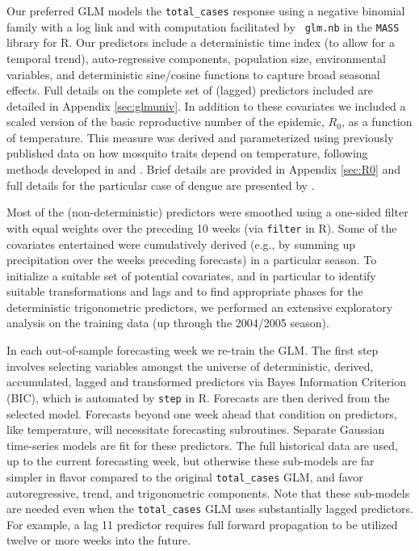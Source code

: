 \documentclass[12pt]{article}
\begin{document}
Our preferred GLM models the \verb!total_cases! response using a negative
binomial family with a log link and with computation facilitated by {\tt
glm.nb} in the {\tt MASS} library \citep{venables:ripley:2002} for {\sf R}.
Our predictors include a deterministic time index (to allow for a temporal
trend), auto-regressive components, population size, environmental variables,
and deterministic sine/cosine functions to capture broad seasonal effects.  
Full details on the complete set of (lagged) predictors included are detailed in Appendix
\ref{sec:glmuniv}. In
addition to these covariates we included a scaled version of the basic
reproductive number of the epidemic, $R_0$, as a function of temperature. This
measure was derived and parameterized using previously published data on how
mosquito traits depend on temperature, following methods developed in
\cite{mordecai:etal:2013} and \cite{johnson:etal:2015}. Brief details are
provided in Appendix \ref{sec:R0} and full details for the particular case of
dengue are presented by \cite{mordecai:etal:2017}.

Most of the (non-deterministic) predictors were smoothed using a one-sided
filter with equal weights over the preceding 10 weeks (via {\tt filter} in
{\sf R}). Some of the covariates entertained were cumulatively derived (e.g.,
by summing up precipitation over the weeks preceding forecasts) in a
particular season.  To initialize a suitable set of potential covariates,
and in particular to identify suitable transformations and lags and to find
appropriate phases for the deterministic trigonometric predictors,  we
performed an extensive exploratory analysis on the training data (up through
the 2004/2005 season).

In each out-of-sample forecasting week we re-train the GLM.  The first step
involves selecting variables amongst the universe of deterministic, derived,
accumulated, lagged and transformed predictors via Bayes Information Criterion
(BIC), which is automated by {\tt step} in {\sf R}.  Forecasts are then
derived from the selected model. Forecasts beyond one week ahead that
condition on predictors, like temperature, will necessitate forecasting
subroutines. Separate Gaussian time-series models are fit for these
predictors. The full historical data are used, up to the current forecasting
week, but otherwise these sub-models are far simpler in flavor compared to the
original \verb!total_cases! GLM, and favor autoregressive, trend, and
trigonometric components.  Note that these sub-models are needed even when the
\verb!total_cases! GLM uses substantially lagged predictors. For example, a
lag 11 predictor requires full forward propagation to be utilized twelve
or more weeks into the future.
\end{document}
